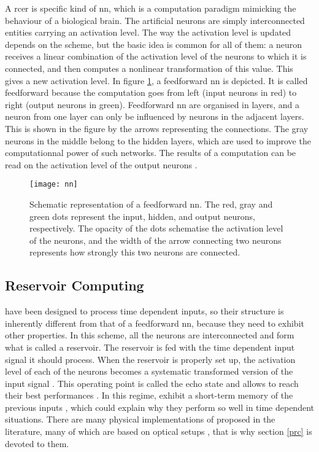 A \gls{rcer} is specific kind of \gls{nn}, which is a computation paradigm mimicking the behaviour of a biological brain. The artificial neurons are simply interconnected entities carrying an activation level. The way the activation level is updated depends on the scheme, but the basic idea is common for all of them: a neuron receives a linear combination of the activation level of the neurons to which it is connected, and then computes a nonlinear transformation of this value. This gives a new activation level. In figure \ref{nn}, a feedforward \gls{nn} is depicted. It is called feedforward because the computation goes from left (input neurons in red) to right (output neurons in green). Feedforward \gls{nn} are organised in layers, and a neuron from one layer can only be influenced by neurons in the adjacent layers. This is shown in the figure by the arrows representing the connections. The gray neurons in the middle belong to the hidden layers, which are used to improve the computationnal power of such networks. The results of a computation can be read on the activation level of the output neurons \cite[p.727]{russell2010artificial}\cite[p.225]{bishop2006pattern}.

\begin{figure}[h]
	\centering
	\texttt{[image: nn]}
	\caption{Schematic representation of a feedforward \gls{nn}. The red, gray and green dots represent the input, hidden, and output neurons, respectively. The opacity of the dots schematise the activation level of the neurons, and the width of the arrow connecting two neurons represents how strongly this two neurons are connected.}
	\label{nn}
\end{figure}


\subsection{Reservoir Computing}

\rcer have been designed to process time dependent inputs, so their structure is inherently different from that of a feedforward \gls{nn}, because they need to exhibit other properties. In this scheme, all the neurons are interconnected and form what is called a reservoir. The reservoir is fed with the time dependent input signal it should process. When the reservoir is properly set up, the activation level of each of the neurons becomes a systematic transformed version of the input signal \cite{Jaeger2004}. This operating point is called the echo state and allows \rcer to reach their best performances \cite{Goudarzi2014ACS, JaegerH.2001Tesa}. In this regime, \rcer exhibit a short-term memory of the previous inputs \cite{Jaeger2004}, which could explain why they perform so well in time dependent situations. There are many physical implementations of \rcer proposed in the literature, many of which are based on optical setups \cite{VanderSande2017}, that is why section \ref{prc} is devoted to them.\\

